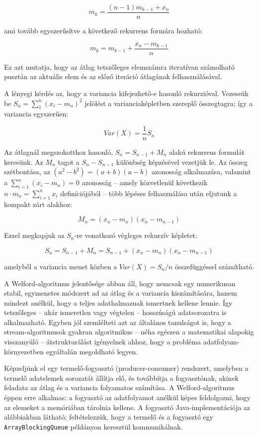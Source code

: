 \documentclass[
]{article}
\begin{document}
\[m_k = \frac{(n-1)m_{k-1} + x_n}{n}\]

ami tovább egyszerűsítve a következő rekurrens formára hozható:

\[m_k = m_{k-1} + \frac{x_n - m_{k-1}}{n}\]

Ez azt mutatja, hogy az átlag tetszőleges elemszámra iteratívan
számolható pusztán az aktuális elem és az előző iteráció átlagának
felhasználásával.

A lényegi kérdés az, hogy a variancia kifejezhető-e hasonló rekurzióval.
Vezessük be \(S_n = \sum_{1}^{n}(x_i - m_n)^2\) jelölést a
varianciaképletben szereplő összegtagra; így a variancia egyszerűen:

\[Var(X) = \frac{1}{n}S_n\]

Az átlagnál megszokotthoz hasonló, \(S_n = S_{n-1} + M_n\) alakú
rekurrens formulát keresünk. Az \(M_n\) tagot a \(S_n - S_{n-1}\)
különbség képzésével vezetjük le. Az összeg szétbontása, az
\((a^2 - b^2) = (a+b)(a-b)\) azonosság alkalmazása, valamint a
\(\sum_{i=1}^{n}(x_i - m_n) = 0\) azonosság -- amely közvetlenül
következik \(n \cdot m_n = \sum_{i=1}^{n} x_i\) definíciójából -- több
lépéses felhasználása után eljutunk a kompakt zárt alakhoz:

\[M_n = (x_n - m_n)(x_n - m_{n-1})\]

Ezzel megkapjuk az \(S_n\)-re vonatkozó végleges rekurzív képletet:

\[S_n = S_{n-1} + M_n = S_{n-1} + (x_n - m_n)(x_n - m_{n-1})\]

amelyből a variancia menet közben a \(Var(X) = S_n/n\) összefüggéssel
számítható.

A Welford-algoritmus jelentősége abban áll, hogy nemcsak egy numerikusan
stabil, egymenetes módszert ad az átlag és a variancia kiszámítására,
hanem mindezt anélkül, hogy a teljes adathalmaznak ismertnek kellene
lennie. Így tetszőleges -- akár ismeretlen vagy végtelen -- hosszúságú
adatsorozatra is alkalmazható. Egyben jól szemlélteti azt az általános
tanulságot is, hogy a stream-algoritmusok gyakran algoritmikus -- néha
egészen a matematikai alapokig visszanyúló -- átstrukturálást igényelnek
ahhoz, hogy a probléma adatfolyam-környezetben egyáltalán megoldható
legyen.

Képzeljünk el egy termelő-fogyasztó (producer-consumer) rendszert,
amelyben a termelő adatelemek sorozatát állítja elő, és továbbítja a
fogyasztónak, akinek feladata az átlag és a variancia folyamatos
számítása. A Welford-algoritmus éppen erre alkalmas: a fogyasztó az
adatfolyamot anélkül képes feldolgozni, hogy az elemeket a memóriában
tárolnia kellene. A fogyasztó Java-implementációja az alábbiakban
látható; feltételezzük, hogy a termelő és a fogyasztó egy
\texttt{ArrayBlockingQueue} példányon keresztül kommunikálnak.
\end{document}
